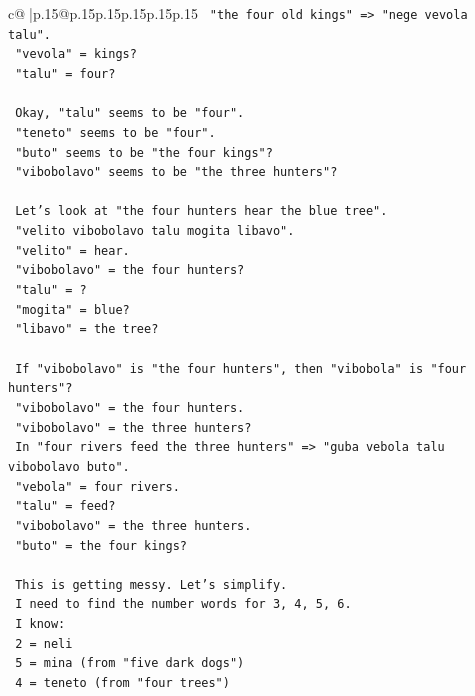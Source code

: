 \documentclass{article}
\begin{document}
{\begin{supertabular}{c@{$\;$}|p{.15\linewidth}@{}p{.15\linewidth}p{.15\linewidth}p{.15\linewidth}p{.15\linewidth}p{.15\linewidth}}
{{{\texttt{   "the four old kings" => "nege vevola talu".} \\
\texttt{   "vevola" = kings?} \\
\texttt{   "talu" = four?} \\
\\ 
\texttt{   Okay, "talu" seems to be "four".} \\
\texttt{   "teneto" seems to be "four".} \\
\texttt{   "buto" seems to be "the four kings"?} \\
\texttt{   "vibobolavo" seems to be "the three hunters"?} \\
\\ 
\texttt{   Let's look at "the four hunters hear the blue tree".} \\
\texttt{   "velito vibobolavo talu mogita libavo".} \\
\texttt{   "velito" = hear.} \\
\texttt{   "vibobolavo" = the four hunters?} \\
\texttt{   "talu" = ?} \\
\texttt{   "mogita" = blue?} \\
\texttt{   "libavo" = the tree?} \\
\\ 
\texttt{   If "vibobolavo" is "the four hunters", then "vibobola" is "four hunters"?} \\
\texttt{   "vibobolavo" = the four hunters.} \\
\texttt{   "vibobolavo" = the three hunters?} \\
\texttt{   In "four rivers feed the three hunters" => "guba vebola talu vibobolavo buto".} \\
\texttt{   "vebola" = four rivers.} \\
\texttt{   "talu" = feed?} \\
\texttt{   "vibobolavo" = the three hunters.} \\
\texttt{   "buto" = the four kings?} \\
\\ 
\texttt{   This is getting messy. Let's simplify.} \\
\texttt{   I need to find the number words for 3, 4, 5, 6.} \\
\texttt{   I know:} \\
\texttt{   2 = neli} \\
\texttt{   5 = mina (from "five dark dogs")} \\
\texttt{   4 = teneto (from "four trees")} \\
}}}
\end{supertabular}}
\end{document}
